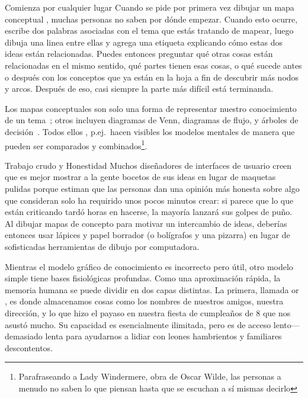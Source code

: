 \begin{aside}{Comienza por cualquier lugar}
  Cuando se pide por primera vez dibujar un mapa conceptual , muchas personas no saben por dónde empezar.
  Cuando esto ocurre,
  escribe dos palabras asociadas con el tema que estás tratando de mapear,
 luego dibuja una linea entre ellas y agrega una etiqueta explicando cómo estas dos ideas están relacionadas.
  Puedes entonces preguntar qué otras cosas están relacionadas en el mismo sentido,
  qué partes tienen esas cosas,
  o qué sucede antes o después con los conceptos que ya están en la hoja
  a fin de descubrir más nodos y arcos.
  Después de eso, casi siempre la parte más difícil está terminanda.
\end{aside}

Los mapas conceptuales son solo una forma de representar nuestro conocimiento de un tema~\cite{Eppl2006};
otros incluyen diagramas de Venn, diagramas de flujo, y árboles de decisión~\cite{Abel2009}.
Todos ellos ,
p.ej.\ hacen visibles los modelos mentales de manera que pueden ser comparados y combinados\footnote{Parafraseando a
 Lady Windermere, obra de Oscar Wilde,
las personas a menudo no saben lo que piensan hasta que se escuchan a sí mismas decirlo}.

\begin{aside}{Trabajo crudo y Honestidad}
  Muchos diseñadores de interfaces de usuario creen que es mejor mostrar a la gente bocetos de sus ideas en lugar de maquetas pulidas
  porque estiman que  las personas dan una opinión más honesta sobre algo que 
  consideran solo ha requirido unos pocos minutos crear:
  si parece que lo que están criticando tardó horas en hacerse, 
  la mayoría lanzará sus golpes de puño.
  Al dibujar mapas de concepto para motivar un intercambio de ideas,
  deberías entonces usar lápices y papel borrador (o bolígrafos y una pizarra)
  en lugar de sofisticadas herramientas de dibujo por computadora.
\end{aside}


Mientras el modelo gráfico de conocimiento es incorrecto pero útil,
otro modelo simple tiene bases fisiológicas profundas.
Como una aproximación rápida,
la memoria humana se puede dividir en dos capas distintas.
La primera,
llamada 
or ,
es donde almacenamos cosas como los nombres de nuestros amigos,
nuestra dirección,
y lo que hizo el payaso en nuestra fiesta de cumpleaños de 8 que nos asustó mucho.
Su capacidad es esencialmente ilimitada,
pero es de acceso lento---demasiado lenta para ayudarnos a lidiar con leones hambrientos  y familiares descontentos.

